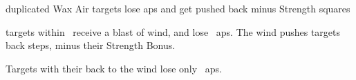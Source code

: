 
  {duplicated}%
  {Wax}%
  {Air}%
  {}%
  {targets lose  \glspl{ap} and get pushed back  minus Strength squares}%
  {
     targets within \spellRange\ receive a blast of wind, and lose ~\glspl{ap}.
    The wind pushes targets back  steps, minus their Strength Bonus.

  Targets with their back to the wind lose only
  \setcounter{track}{\value{spelllevel}}%
  ~\glspl{ap}.
  }
